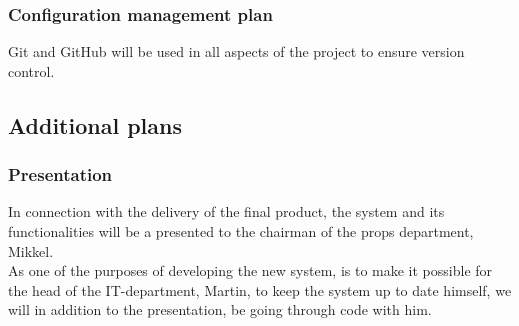 \documentclass[12pt]{article}
\begin{document}
\subsubsection{Configuration management plan}
Git and GitHub will be used in all aspects of the project to ensure version control.
\subsection{Additional plans}
\subsubsection{Presentation}
In connection with the delivery of the final product, the system and its functionalities will be a presented to the chairman of the props department, Mikkel. \\
As one of the purposes of developing the new system, is to make it possible for the head of the IT-department, Martin, to keep the system up to date himself, we will in addition to the presentation, be going through code with him.
\end{document}
